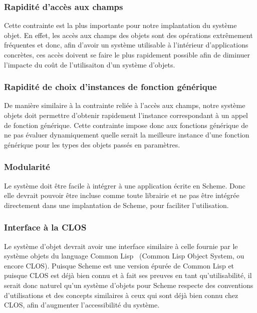     \subsubsection{Rapidité d'accès aux champs}
      Cette contrainte est la plus importante pour notre implantation
      du système objet. En effet, les accès aux champs des objets sont
      des opérations extrêmement fréquentes et donc, afin d'avoir un
      système utilisable à l'intérieur d'applications concrètes, ces
      accès doivent se faire le plus rapidement possible afin de
      diminuer l'impacte du coût de l'utilisaiton d'un système
      d'objets.

    \subsubsection{Rapidité de choix d'instances de fonction générique}
      De manière similaire à la contrainte reliée à l'accès aux
      champs, notre système objets doit permettre d'obtenir rapidement
      l'instance correspondant à un appel de fonction générique. Cette
      contrainte impose donc aux fonctions générique de ne pas évaluer
      dynamiquement quelle serait la meilleure instance d'une fonction
      générique pour les types des objets passés en paramètres.

    \subsubsection{Modularité}
      Le système doit être facile à intégrer à une application écrite
      en Scheme. Donc elle devrait pouvoir être incluse comme toute
      librairie et ne pas être intégrée directement dans une
      implantation de Scheme, pour faciliter l'utilisation.

    \subsubsection{Interface à la CLOS}
      Le système d'objet devrait avoir une interface similaire à celle
      fournie par le système objets du language Common
      Lisp~\cite{COMMONLISP} (Common Lisp Object System, ou encore
      CLOS). Puisque Scheme est une version épurée de Common Lisp et
      puisque CLOS est déjà bien connu et à fait ses preuves en tant
      qu'utilisabilité, il serait donc naturel qu'un système d'objets
      pour Scheme respecte des conventions d'utilisations et des
      concepts similaires à ceux qui sont déjà bien connu chez CLOS,
      afin d'augmenter l'accessibilité du système.
    
